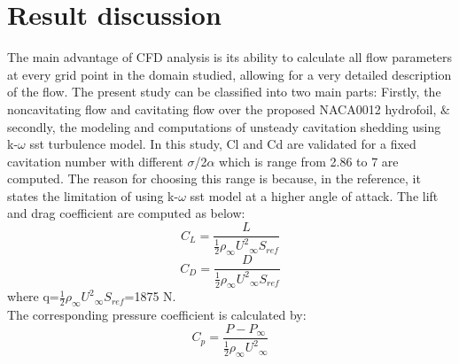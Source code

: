 \chapter{Result discussion}
The main advantage of CFD analysis is its ability to calculate all flow parameters 
at every grid point in the domain studied, allowing for a very detailed description of the
flow. The present study can be classified into two main parts: Firstly, the
noncavitating flow and cavitating flow over the proposed NACA0012 hydrofoil, $\&$
secondly, the modeling and computations of unsteady cavitation shedding using k-$\omega$ sst turbulence model. In this
study, Cl and Cd are validated for a fixed cavitation number with different $\sigma$/{2$\alpha$} which is 
range from 2.86 to 7 are computed. The reason for choosing this range is because, in the reference\cite{Zhao2021}, it states 
the limitation of using  k-$\omega$ sst model at a higher angle of attack.
The lift and drag coefficient are computed as below:
\begin{equation}
{C_L}=\frac{L}{{\frac{1}{2}}{{\rho}_{\infty}}{{{U}^2}_{\infty}}{S_{ref}}}
\end{equation}
\begin{equation}
{C_D}=\frac{D}{{\frac{1}{2}}{{\rho}_{\infty}}{{{U}^2}_{\infty}}{S_{ref}}}
\end{equation}
where q=${{\frac{1}{2}}{{\rho}_{\infty}}{{{U}^2}_{\infty}}{S_{ref}}}$=1875 N.\\ 
The corresponding pressure coefficient is calculated by:
\begin{equation}
{C_p}=\frac{P-{P_{\infty}}}{{\frac{1}{2}}{{\rho}_{\infty}}{{{U}^2}_{\infty}}}
\end{equation}
